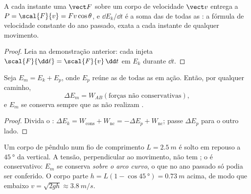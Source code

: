 \begin{proposition}\label{prop:g12:work-and-energy:power}
A cada instante uma  $\vect F$ sobre um corpo de velocidade $\vect v$ entrega a
 $P = \scal{F}{v} = Fv\cos\theta$, e $\dd E_k/\dd t$ é a soma das  de
todas as : a fórmula de velocidade constante do ano passado, exata a cada
instante de qualquer movimento.
\end{proposition}

\begin{proof}
Leia na demonstração anterior: cada  injeta
$\scal{F}{\dd\ell} = \scal{F}{v}\,\dd t$ em $E_k$ durante $\dd t$.
\end{proof}

\begin{theorem}\label{thm:g12:work-and-energy:emtheorem}
Seja $E_m = E_k + E_p$, onde $E_p$ reúne as  de todas as  em ação. Então, por qualquer caminho,
\[
\Delta E_m = W_{AB}(\text{forças não conservativas}),
\]
e $E_m$ se conserva sempre que as  não realizam .
\end{theorem}

\begin{proof}
Divida o :
$\Delta E_k = W_{\text{cons}} + W_{\text{nc}} = -\Delta E_p + W_{\text{nc}}$; passe
$\Delta E_p$ para o outro lado.
\end{proof}

\begin{example}\label{ex:g12:work-and-energy:pendulum}
Um corpo de pêndulo num fio de comprimento $L = \qty{2.5}{m}$ é solto em repouso a
$\qty{45}{\degree}$ da vertical. A tensão, perpendicular ao movimento, não tem
; o  é conservativo: $E_m$ se conserva \emph{sobre o arco curvo}, o que no
ano passado só podia ser conferido. O corpo parte $h = L(1 - \cos\qty{45}{\degree}) =
\qty{0.73}{m}$ acima, de modo que embaixo $v = \sqrt{2gh} \approx \qty{3.8}{m/s}$.
\end{example}

